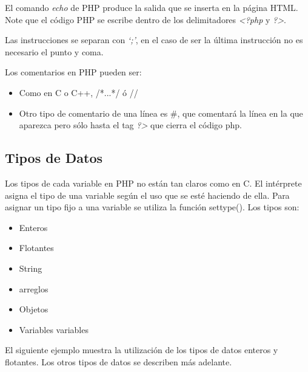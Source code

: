 \documentclass[a5paper,10pt,spanish]{sphinxmanual}
\begin{document}
El comando \emph{echo} de PHP produce la salida que se inserta en la página
HTML. Note que el código PHP se escribe dentro de los delimitadores
\emph{\textless{}?php} y \emph{?\textgreater{}}.

Las instrucciones se separan con \emph{`;'}, en el caso de ser la última
instrucción no es necesario el punto y coma.

Los comentarios en PHP pueden ser:
\begin{itemize}
\item {} 
Como en C o C++, /*...*/ ó //

\item {} 
Otro tipo de comentario de una línea es \#, que comentará la línea en
la que aparezca pero sólo hasta el tag \emph{?\textgreater{}} que cierra el código php.

\end{itemize}


\subsection{Tipos de Datos}
\label{Tutorial1_Conceptos.md:tipos-de-datos}
Los tipos de cada variable en PHP no están tan claros como en C. El
intérprete asigna el tipo de una variable según el uso que se esté
haciendo de ella. Para asignar un tipo fijo a una variable se utiliza la
función settype(). Los tipos
son:
\begin{itemize}
\item {} 
Enteros

\item {} 
Flotantes

\item {} 
String

\item {} 
arreglos

\item {} 
Objetos

\item {} 
Variables variables

\end{itemize}

El siguiente ejemplo muestra la utilización de los tipos de datos
enteros y flotantes. Los otros tipos de datos se describen más adelante.
\end{document}
